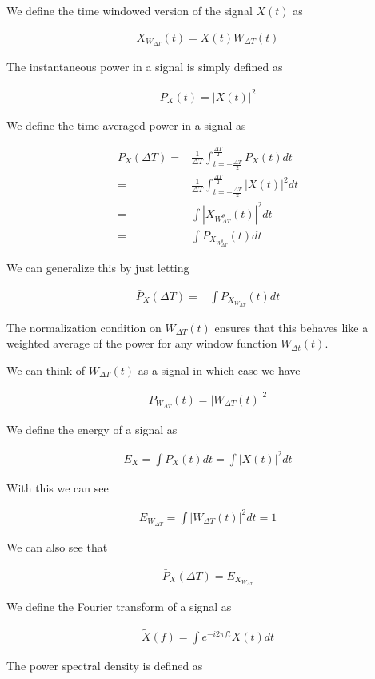 \documentclass[12pt]{article}
\begin{document}
We define the time windowed version of the signal $X(t)$ as

\begin{align}
X_{W_{\Delta T}}(t) = X(t)W_{\Delta T}(t)
\end{align}

The instantaneous power in a signal is simply defined as

\begin{align}
P_X(t) = |X(t)|^2
\end{align}

We define the time averaged power in a signal as

\begin{align}
\bar{P}_X(\Delta T) =& \frac{1}{\Delta T}\int_{t=-\frac{\Delta T}{2}}^{\frac{\Delta T}{2}} P_X(t) dt\\
=& \frac{1}{\Delta T}\int_{t=-\frac{\Delta T}{2}}^{\frac{\Delta T}{2}} |X(t)|^2 dt\\
=& \int |X_{W^{\theta}_{\Delta T}}(t)|^2 dt\\
=& \int P_{X_{W^{\theta}_{\Delta T}}}(t) dt
\end{align}

We can generalize this by just letting

\begin{align}
\bar{P}_X(\Delta T) =& \int P_{X_{W_{\Delta T}}}(t) dt
\end{align}

The normalization condition on $W_{\Delta T}(t)$ ensures that this behaves like a weighted average of the power for any window function $W_{\Delta t}(t)$.

We can think of $W_{\Delta T}(t)$ as a signal in which case we have

\begin{align}
P_{W_{\Delta T}}(t) = |W_{\Delta T}(t)|^2
\end{align}

We define the energy of a signal as

\begin{align}
E_X = \int P_X(t) dt = \int |X(t)|^2 dt
\end{align}

With this we can see

\begin{align}
E_{W_{\Delta T}} = \int |W_{\Delta T}(t)|^2 dt = 1
\end{align}

We can also see that

\begin{align}
\bar{P}_X(\Delta T) = E_{X_{W_{\Delta T}}}
\end{align}

We define the Fourier transform of a signal as

\begin{align}
\tilde{X}(f) = \int e^{-i2\pi f t} X(t) dt
\end{align}

The power spectral density is defined as 

\begin{align}

\end{align}
\end{document}
